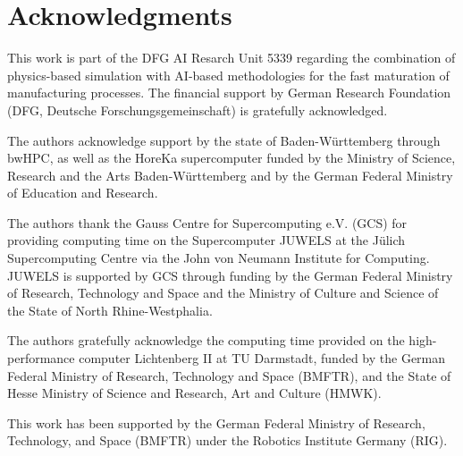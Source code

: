     \section*{Acknowledgments}
    This work is part of the DFG AI Resarch Unit 5339 regarding the combination of physics-based
    simulation with AI-based methodologies for the fast maturation of manufacturing processes. The
    financial support by German Research Foundation (DFG, Deutsche Forschungsgemeinschaft) is
    gratefully acknowledged. 
    
    The authors acknowledge support by the state of Baden-Württemberg
    through bwHPC, as well as the HoreKa supercomputer funded by the Ministry of Science, Research
    and the Arts Baden-Württemberg and by the German Federal Ministry of Education and Research. 
    
    The authors thank the Gauss Centre for Supercomputing e.V. (GCS) for providing computing time on the Supercomputer JUWELS \citep{JUWELS} at the Jülich Supercomputing Centre via the John von Neumann Institute for Computing. JUWELS is supported by GCS through funding by the German Federal Ministry of Research, Technology and Space and the Ministry of Culture and Science of the State of North Rhine-Westphalia.
    
    The authors gratefully acknowledge the computing time provided on the high-performance computer Lichtenberg II at TU Darmstadt, funded by the German Federal Ministry of Research, Technology and Space (BMFTR), and the State of Hesse Ministry of Science and Research, Art and Culture (HMWK).
    
    This work has been supported by the German Federal Ministry of Research, Technology, and Space (BMFTR) under the Robotics Institute Germany (RIG).